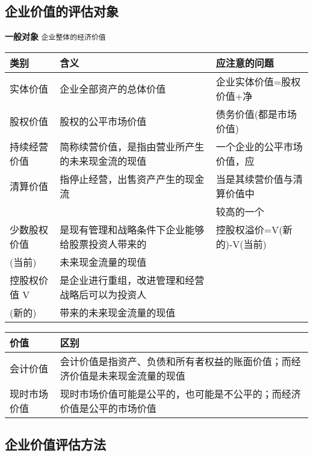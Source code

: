 \documentclass[11pt]{article}
\begin{document}
\subsection{企业价值的评估对象}
\label{sec:org65255c4}
\textbf{一般对象} \texttt{企业整体的经济价值}
\begin{center}
\begin{tabular}{lll}
类别 & 含义 & 应注意的问题\\
\hline
实体价值 & 企业全部资产的总体价值 & 企业实体价值=股权价值+净\\
股权价值 & 股权的公平市场价值 & 债务价值(都是市场价值)\\
\hline
持续经营价值 & 简称续营价值，是指由营业所产生的未来现金流的现值 & 一个企业的公平市场价值，应\\
清算价值 & 指停止经营，出售资产产生的现金流 & 当是其续营价值与清算价值中\\
 &  & 较高的一个\\
\hline
少数股权价值 & 是现有管理和战略条件下企业能够给股票投资人带来的 & 控股权溢价=V(新的)-V(当前)\\
(当前) & 未来现金流量的现值 & \\
控股权价值 V & 是企业进行重组，改进管理和经营战略后可以为投资人 & \\
(新的) & 带来的未来现金流量的现值 & \\
\end{tabular}
\end{center}

\begin{center}
\begin{tabular}{ll}
价值 & 区别\\
\hline
会计价值 & 会计价值是指资产、负债和所有者权益的账面价值；而经济价值是未来现金流量的现值\\
现时市场价值 & 现时市场价值可能是公平的，也可能是不公平的；而经济价值是公平的市场价值\\
\end{tabular}
\end{center}

\subsection{企业价值评估方法}
\label{sec:orgad43ac6}
\end{document}
